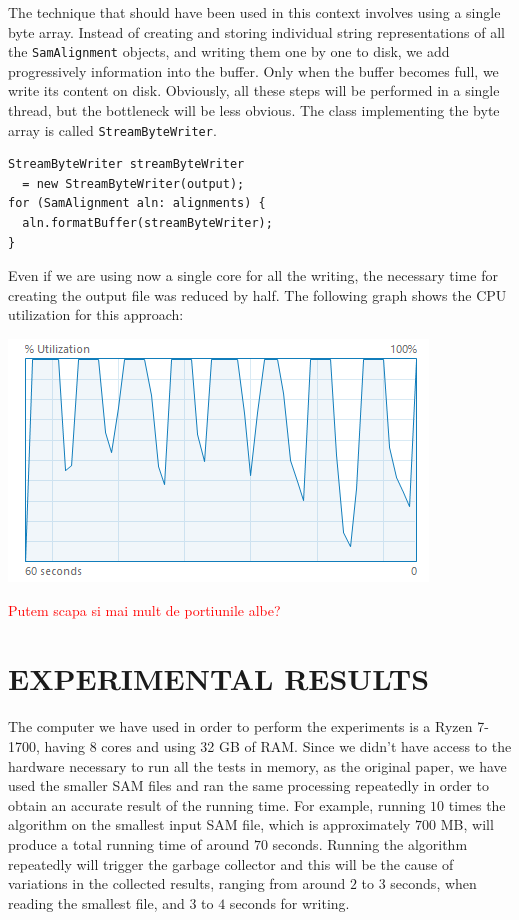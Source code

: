 \documentclass[a4paper,twoside]{article}
\begin{document}
The technique that should have been used in this context involves using a single byte array.
Instead of creating and storing individual string representations of all the {\tt SamAlignment} objects, and writing them one by one to disk, we add progressively information into the buffer. Only when the buffer becomes full, we write its content on disk. Obviously, all these steps will be performed in a single thread, but the bottleneck will be less obvious. The class implementing the byte array is called {\tt StreamByteWriter}.
\begin{verbatim}
StreamByteWriter streamByteWriter 
  = new StreamByteWriter(output);
for (SamAlignment aln: alignments) {
  aln.formatBuffer(streamByteWriter);
}
\end{verbatim}
Even if we are using now a single core for all the writing, the necessary time for creating the output file was reduced by half. The following graph shows the CPU utilization for this approach:
\begin{center}
\includegraphics[scale=0.5]{images/cpu_optimized.png}
\end{center}

\textcolor{red}{Putem scapa si mai mult de portiunile albe?}





\section{\uppercase{Experimental Results}}

The computer we have used in order to perform the experiments is a Ryzen 7-1700, having 8 cores and using 32 GB of RAM.
Since we didn't have access to the hardware necessary to run all the tests in memory, as the original paper, we have used the smaller SAM files and ran the same processing repeatedly in order to obtain an accurate result of the running time.
For example, running $10$ times the algorithm on the smallest input SAM file, which is approximately $700$ MB, will produce a total running time of around $70$ seconds. 
Running the algorithm repeatedly will trigger the garbage collector and this will be the cause of variations in the collected results, ranging from around $2$ to $3$ seconds, when reading the smallest file, and $3$ to $4$ seconds for writing.
\end{document}
